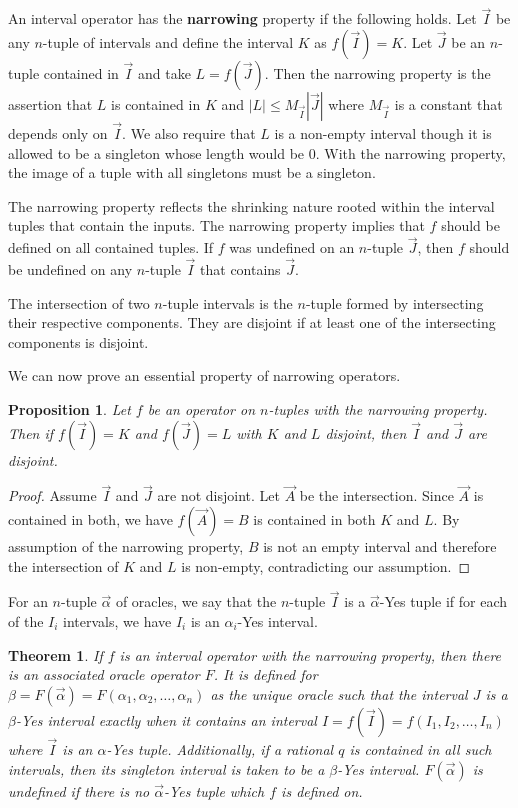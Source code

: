 \documentclass[12pt]{article}
\newtheorem{theorem}{Theorem}
\newtheorem{proposition}{Proposition}
\theoremstyle{remark}
\begin{document}
An interval operator has the \textbf{narrowing} property if the following holds. Let $\vec{I}$ be any $n$-tuple of intervals and define the interval $K$ as $f(\vec{I}) = K$. Let $\vec{J}$ be an $n$-tuple contained in $\vec{I}$ and take $L= f(\vec{J})$. Then the narrowing property is the assertion that $L$ is contained in $K$ and $|L| \leq M_{\vec{I}} |\vec{J}|$ where $M_{\vec{I}}$ is a constant that depends only on $\vec{I}$. We also require that $L$ is a non-empty interval though it is allowed to be a singleton whose length would be 0. With the narrowing property, the image of a tuple with all singletons must be a singleton. 

The narrowing property reflects the shrinking nature rooted within the interval tuples that contain the inputs. The narrowing property implies that $f$ should be defined on all contained tuples. If $f$ was undefined on an $n$-tuple $\vec{J}$, then $f$ should be undefined on any $n$-tuple $\vec{I}$ that contains $\vec{J}$. 



The intersection of two $n$-tuple intervals is the $n$-tuple formed by intersecting their respective components. They are disjoint if at least one of the intersecting components is disjoint. 

We can now prove an essential property of narrowing operators. 

\begin{proposition} \label{pr:op-nrw}
Let $f$ be an operator on $n$-tuples with the narrowing property. Then if $f(\vec{I})=K$ and $f(\vec{J}) = L$ with $K$ and $L$ disjoint, then $\vec{I}$ and $\vec{J}$ are disjoint.
\end{proposition}

\begin{proof}
Assume $\vec{I}$ and $\vec{J}$ are not disjoint. Let $\vec{A}$ be the intersection. Since $\vec{A}$ is contained in both, we have $f(\vec A)= B$ is contained in both $K$ and $L$. By assumption of the narrowing property, $B$ is not an empty interval and therefore the intersection of $K$ and $L$ is non-empty, contradicting our assumption. 
\end{proof}

For an $n$-tuple $\vec{\alpha}$ of oracles, we say that the $n$-tuple $\vec{I}$ is a $\vec{\alpha}$-Yes tuple if for each of the $I_i$ intervals, we have $I_i$ is an $\alpha_i$-Yes interval. 

\begin{theorem}
If $f$ is an interval operator with the narrowing property, then there is an associated oracle operator $F$. It is defined for $\beta = F(\vec{\alpha}) = F(\alpha_1, \alpha_2, \ldots, \alpha_n)$ as the unique oracle such that the interval $J$ is a $\beta$-Yes interval exactly when it contains an interval $I = f(\vec{I}) = f(I_1, I_2, \ldots, I_n)$ where $\vec{I}$ is an $\alpha$-Yes tuple. Additionally, if a rational $q$ is contained in all such intervals, then its singleton interval is taken to be a $\beta$-Yes interval. $F(\vec{\alpha})$ is undefined if there is no $\vec{\alpha}$-Yes tuple which $f$ is defined on. 
\end{theorem}
\end{document}
